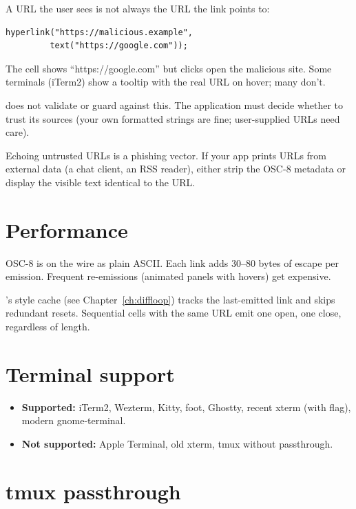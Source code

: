 A URL the user sees is not always the URL the link points to:

\begin{lstlisting}
hyperlink("https://malicious.example",
         text("https://google.com"));
\end{lstlisting}

The cell shows ``https://google.com'' but clicks open the
malicious site. Some terminals (iTerm2) show a tooltip with
the real URL on hover; many don't.

\maya{} does not validate or guard against this. The
application must decide whether to trust its sources (your own
formatted strings are fine; user-supplied URLs need care).

\begin{warning}
Echoing untrusted URLs is a phishing vector. If your app
prints URLs from external data (a chat client, an RSS reader),
either strip the OSC-8 metadata or display the visible text
identical to the URL.
\end{warning}

\section{Performance}

OSC-8 is on the wire as plain ASCII. Each link adds 30--80
bytes of escape per emission. Frequent re-emissions (animated
panels with hovers) get expensive.

\maya{}'s style cache (see Chapter~\ref{ch:diffloop}) tracks the
last-emitted link and skips redundant resets. Sequential cells
with the same URL emit one open, one close, regardless of
length.

\section{Terminal support}

\begin{itemize}[leftmargin=*]
  \item \textbf{Supported:} iTerm2, Wezterm, Kitty, foot,
    Ghostty, recent xterm (with flag), modern gnome-terminal.
  \item \textbf{Not supported:} Apple Terminal, old xterm,
    tmux without passthrough.
\end{itemize}

\section{tmux passthrough}

